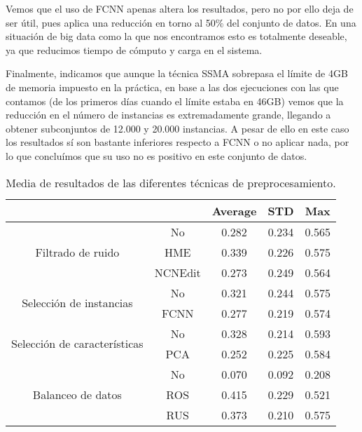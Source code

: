 Vemos que el uso de FCNN apenas altera los resultados, pero no por ello deja de ser útil, pues aplica una reducción en torno al 50\% del conjunto de datos. En una situación de big data como la que nos encontramos esto es totalmente deseable, ya que reducimos tiempo de cómputo y carga en el sistema.

\vspace{\baselineskip}

Finalmente, indicamos que aunque la técnica SSMA sobrepasa el límite de 4GB de memoria impuesto en la práctica, en base a las dos ejecuciones con las que contamos (de los primeros días cuando el límite estaba en 46GB) vemos que la reducción en el número de instancias es extremadamente grande, llegando a obtener subconjuntos de 12.000 y 20.000 instancias.
A pesar de ello en este caso los resultados sí son bastante inferiores respecto a FCNN o no aplicar nada, por lo que concluímos que su uso no es positivo en este conjunto de datos.

\begin{table}
    \centering
    \begin{tabular}{cc|c|c|c|}
    \cline{3-5}
    \multicolumn{1}{l}{\textbf{}} & \textbf{} & \multicolumn{1}{c|}{\textbf{Average}} & \multicolumn{1}{c|}{\textbf{STD}} & \textbf{Max} \\ \hline
    \multicolumn{1}{|c|}{\multirow{3}{*}{Filtrado de ruido}}       & No        & 0.282  & 0.234
    & 0.565    \\ \cline{2-5} 
    \multicolumn{1}{|c|}{}  & HME       & 0.339   & 0.226    & 0.575        \\ \cline{2-5} 
    \multicolumn{1}{|c|}{}  & NCNEdit   & 0.273   & 0.249    & 0.564        \\ \hline
    \multicolumn{1}{|c|}{\multirow{2}{*}{Selección de instancias}} & No        & 0.321  & 0.244    & 0.575        \\ \cline{2-5} 
    \multicolumn{1}{|c|}{}  & FCNN      & 0.277   & 0.219    & 0.574        \\ \hline
    \multicolumn{1}{|c|}{\multirow{2}{*}{Selección de características}} & No        & 0.328  & 0.214    & 0.593        \\ \cline{2-5} 
    \multicolumn{1}{|c|}{}  & PCA      & 0.252    & 0.225    & 0.584        \\ \hline
    \multicolumn{1}{|c|}{\multirow{3}{*}{Balanceo de datos}}       & No        & 0.070  & 0.092    & 0.208        \\ \cline{2-5} 
    \multicolumn{1}{|c|}{}  & ROS       & 0.415   & 0.229    & 0.521        \\ \cline{2-5} 
    \multicolumn{1}{|c|}{}  & RUS       & 0.373   & 0.210    & 0.575        \\ \hline
    \end{tabular}
    \caption{Media de resultados de las diferentes técnicas de preprocesamiento.}
    \label{avg}
\end{table}

